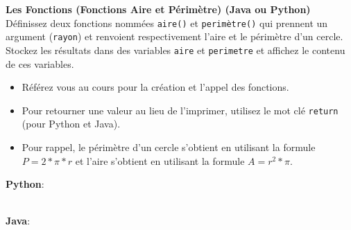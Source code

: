 \begin{Exercice}[5 minutes] \textbf{Les Fonctions (Fonctions Aire et Périmètre) (Java ou Python)}\\
    Définissez deux fonctions nommées \lstinline{aire()} et \lstinline{perimètre()} qui prennent un argument (\lstinline{rayon}) et renvoient respectivement l'aire et le périmètre d'un cercle. Stockez les résultats dans des variables \lstinline{aire} et \lstinline{perimetre} et affichez le contenu de ces variables.   \\
   
    \begin{conseil}
        \begin{itemize}
            \item Référez vous au cours pour la création et l'appel des fonctions.
            \item Pour retourner une valeur au lieu de l'imprimer, utilisez le mot clé \lstinline{return} (pour Python et Java).
            \item Pour rappel, le périmètre d'un cercle s'obtient en utilisant la formule $P = 2*\pi*r$ et l'aire s'obtient en utilisant la formule $A = r^2*\pi$.
        \end{itemize}        
    \end{conseil}
    \begin{solution}
        \textbf{Python}:
        
        
        \textbf{\\Java}:
        
    \end{solution}   
\end{Exercice} 




\newpage



